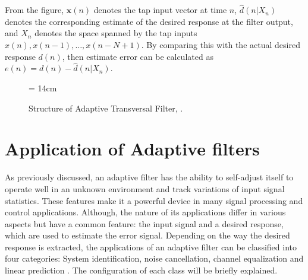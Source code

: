 \vspace{-0.5cm}
\par
 \noindent From the figure, $\textbf{x}(n)$ denotes the tap input vector at time $n$, $\hat{d}(n|X_n)$ denotes the corresponding estimate of the desired response at the filter output, and $X_n$ denotes the space spanned by the tap inputs $x(n), x(n-1),\ldots, x(n-N+1)$. By comparing this with the actual desired response $d(n)$, then estimate error can be calculated as $e(n)=d(n)-\hat{d}(n|X_n)$.
 \begin{figure}[!htb]
\begin{center}
\vspace{1cm}
\epsfxsize = 14cm
\end{center}
\vspace{-1cm}
\caption{Structure of Adaptive Transversal Filter, \cite{shukur}.}
\label{fig2x}
\vspace{1.5cm}
\end{figure}


\vspace{-0.3cm}
\section{Application of Adaptive filters}\label{sec:1.3}
\vspace{-0.5cm}
\noindent As previously discussed, an adaptive filter has the ability to self-adjust itself to operate well in an unknown environment and track variations of input signal statistics. These features make it a powerful device in many signal processing and control applications. Although, the nature of its applications differ in various aspects but have a common feature: the input signal and a desired response, which are used to estimate the error signal. Depending on the way the desired response is extracted, the applications of an adaptive filter can be classified into four categories: System identification, noise cancellation, channel equalization and linear prediction \cite{Haykins}. The configuration of each class will be briefly explained.



\vspace{-0.3cm}
